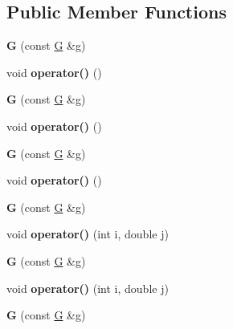 \subsection*{Public Member Functions}
\begin{DoxyCompactItemize}
\item 
\mbox{\label{class_g_aa7cbe260dd651346d376f02b9022eb2b}} 
{\bfseries G} (const \mbox{\hyperlink{class_g}{G}} \&g)
\item 
\mbox{\label{class_g_ade2a739d91a0d727157463ddc0496b60}} 
void {\bfseries operator()} ()
\item 
\mbox{\label{class_g_aa7cbe260dd651346d376f02b9022eb2b}} 
{\bfseries G} (const \mbox{\hyperlink{class_g}{G}} \&g)
\item 
\mbox{\label{class_g_ade2a739d91a0d727157463ddc0496b60}} 
void {\bfseries operator()} ()
\item 
\mbox{\label{class_g_aa7cbe260dd651346d376f02b9022eb2b}} 
{\bfseries G} (const \mbox{\hyperlink{class_g}{G}} \&g)
\item 
\mbox{\label{class_g_ade2a739d91a0d727157463ddc0496b60}} 
void {\bfseries operator()} ()
\item 
\mbox{\label{class_g_aa7cbe260dd651346d376f02b9022eb2b}} 
{\bfseries G} (const \mbox{\hyperlink{class_g}{G}} \&g)
\item 
\mbox{\label{class_g_a273002c51e9ef6ff06ba4629c8b8d56d}} 
void {\bfseries operator()} (int i, double j)
\item 
\mbox{\label{class_g_aa7cbe260dd651346d376f02b9022eb2b}} 
{\bfseries G} (const \mbox{\hyperlink{class_g}{G}} \&g)
\item 
\mbox{\label{class_g_a273002c51e9ef6ff06ba4629c8b8d56d}} 
void {\bfseries operator()} (int i, double j)
\item 
\mbox{\label{class_g_aa7cbe260dd651346d376f02b9022eb2b}} 
{\bfseries G} (const \mbox{\hyperlink{class_g}{G}} \&g)
\item 
\mbox{\label{class_g_ade2a739d91a0d727157463ddc0496b60}} 

\end{DoxyCompactItemize}
